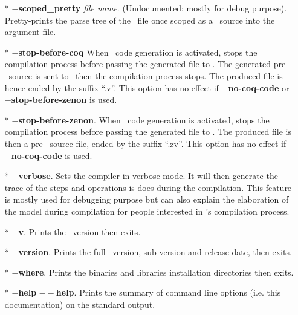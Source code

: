 \begin{itemize}
  \item[*] {\bf $-$scoped\_pretty} {\em file name}. (Undocumented:
    mostly for debug purpose). Pretty-prints the parse tree of the
    \focal\ file once scoped as a \focal\ source into the argument
    file.

  \item[*] {\bf $-$stop-before-coq} When \coq\ code generation is
    activated, stops the compilation process before passing the
    generated file to \coq. The generated pre-\coq\ source is sent to
    \zenon\ then the compilation process stops. The produced file is
    hence ended by the suffix ``.v''. This option has no effect if
    {\bf $-$no-coq-code} or {\bf $-$stop-before-zenon} is used.

   \item[*] {\bf $-$stop-before-zenon}. When \coq\ code generation is
     activated, stops the compilation process before passing the
     generated file to \zenon. The produced file is then a pre-\coq\
     source file, ended by the suffix ``.zv''. This option has no
     effect if {\bf $-$no-coq-code} is used.

  \item[*] {\bf $-$verbose}. Sets the compiler in verbose mode. It
    will then generate the trace of the steps and operations is does
    during the compilation. This feature is mostly used for debugging
    purpose but can also explain the elaboration of the model during
    compilation for people interested in \focal's compilation
    process.

  \item[*] {\bf $-$v}. Prints the \focal\ version then exits.

  \item[*] {\bf $-$version}. Prints the full \focal\ version,
    sub-version and release date, then exits.

  \item[*] {\bf $-$where}. Prints the binaries and libraries
    installation directories then exits.

  \item[*] {\bf $-$help} {\bf $--$help}. Prints the summary of command
    line options (i.e. this documentation) on the standard output.
\end{itemize}
